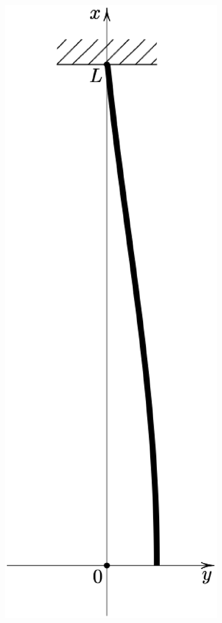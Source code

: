 \begin{figure}[H]
    \centering
    \includegraphics[scale=0.4]{Imagenes/Cadena_Oscilante_03_png.eps}

\end{figure}
